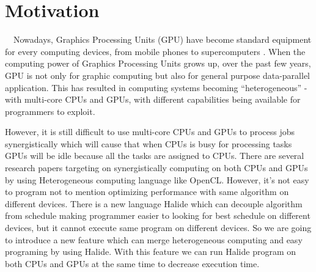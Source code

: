 \chapter{Motivation}
\quad\ \ Nowadays, Graphics Processing Units (GPU) have become standard equipment for every computing devices, from mobile phones to supercomputers . When the computing power of Graphics Processing Units grows up, over the past few years, GPU is not only for graphic computing but also for general purpose data-parallel application. This has resulted in computing systems becoming “heterogeneous” - with multi-core CPUs and GPUs, with different capabilities being available for programmers to exploit.

However, it is still difficult to use multi-core CPUs and GPUs to process jobs synergistically which will cause that when CPUs is busy for processing tasks GPUs will be idle because all the tasks are assigned to CPUs. There are several research papers targeting on synergistically computing on both CPUs and GPUs by using Heterogeneous computing language like OpenCL. However, it’s not easy to program not to mention optimizing performance with same algorithm on different devices.
There is a new language Halide which can decouple algorithm from schedule making programmer easier to looking for best schedule on different devices, but it cannot execute same program on different devices. So we are going to introduce a new feature which can merge heterogeneous computing and easy programing by using Halide. With this feature we can run Halide program on both CPUs and GPUs at the same time to decrease execution time.
